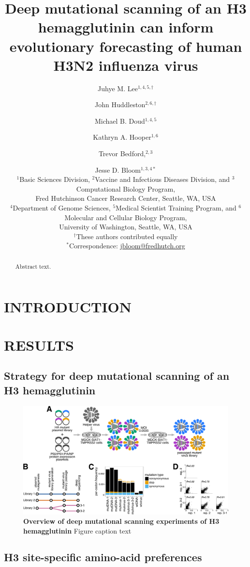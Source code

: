 \documentclass[11pt]{article}
\title{Deep mutational scanning of an H3 hemagglutinin can inform evolutionary forecasting of human H3N2 influenza virus}
\author{
Juhye M. Lee$^{1,4,5,\dagger}$ \and 
John Huddleston$^{2,6,\dagger}$ \and 
Michael B. Doud$^{1,4,5}$ \and 
Kathryn A. Hooper$^{1,6}$ \and
Trevor Bedford,$^{2,3}$ \and 
Jesse D. Bloom$^{1,3,4*}$
\\
\scriptsize{$^1$Basic Sciences Division, $^2$Vaccine and Infectious Diseases Division, and $^3$Computational Biology Program,} \\
\scriptsize{Fred Hutchinson Cancer Research Center, Seattle, WA, USA} \\
\scriptsize{$^4$Department of Genome Sciences, $^5$Medical Scientist Training Program, and $^6$Molecular and Cellular Biology Program,} \\
\scriptsize{University of Washington, Seattle, WA, USA} \\
\scriptsize{$^{\dagger}$These authors contributed equally} \\
\scriptsize{$^*$Correspondence: \href{jbloom@fredhutch.org}{jbloom@fredhutch.org}}
}
\date{}
\begin{document}
\maketitle
\onehalfspacing

\begin{abstract}
Abstract text.
\end{abstract}

\section*{INTRODUCTION}


\section*{RESULTS}
\label{sec:results}

\subsection*{Strategy for deep mutational scanning of an H3 hemagglutinin}

\begin{figure}
\centerline{\includegraphics[width=\textwidth]{figs/dms_overview/dms_overview.pdf}}
\caption{\label{fig:dms_overview}
{\bf Overview of deep mutational scanning experiments of H3 hemagglutinin}
Figure caption text
}
\end{figure}


\subsection*{H3 site-specific amino-acid preferences}
\end{document}
